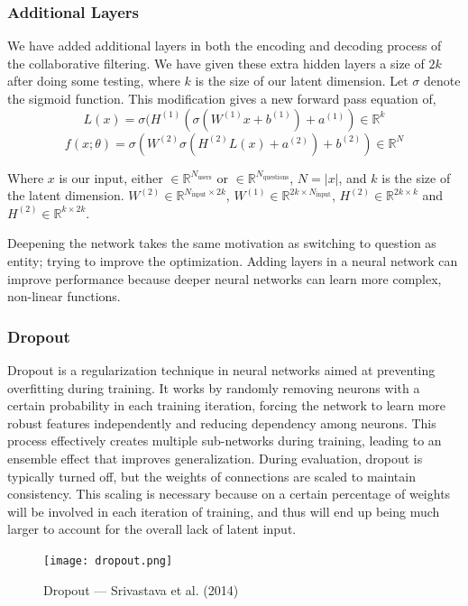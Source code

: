 \documentclass{article}
\begin{document}
\subsubsection{Additional Layers}
We have added additional layers in both the encoding and decoding process of the collaborative filtering. We have given these extra hidden layers a size of $2k$ after doing some testing, where $k$ is the size of our latent dimension. Let $\sigma$ denote the sigmoid function. This modification gives a new forward pass equation of,
$$L(x) = \sigma(H^{(1)}(\sigma(W^{(1)}x + b^{(1)}) + a^{(1)}) \in \mathbb{R}^{k}$$
$$f(x; \theta) = \sigma(W^{(2)}\sigma(H^{(2)}L(x) + a^{(2)}) + b^{(2)}) \in \mathbb{R}^N$$

Where $x$ is our input, either $\in \mathbb{R}^{N_{\text{users}}}$ or $\in \mathbb{R}^{N_{\text{questions}}}$, $N = |x|$, and $k$ is the size of the latent dimension. $W^{(2)} \in \mathbb{R}^{N_{\text{input}}\times 2k}$, $W^{(1)} \in \mathbb{R}^{2k\times N_{\text{input}}}$, $H^{(2)} \in \mathbb{R}^{2k\times k}$ and $H^{(2)} \in \mathbb{R}^{k\times 2k}$.

Deepening the network takes the same motivation as switching to question as entity; trying to improve the optimization. Adding layers in a neural network can improve performance because deeper neural networks can learn more complex, non-linear functions.
\subsubsection{Dropout}

Dropout is a regularization technique in neural networks aimed at preventing overfitting during training. It works by randomly removing neurons with a certain probability in each training iteration, forcing the network to learn more robust features independently and reducing dependency among neurons. This process effectively creates multiple sub-networks during training, leading to an ensemble effect that improves generalization. During evaluation, dropout is typically turned off, but the weights of connections are scaled to maintain consistency. This scaling is necessary because on a certain percentage of weights will be involved in each iteration of training, and thus will end up being much larger to account for the overall lack of latent input.
\begin{figure}[H]
    \centering
    \texttt{[image: dropout.png]}
    \caption{Dropout — Srivastava et al. (2014)}
    \label{fig:enter-label}
\end{figure}
\end{document}
